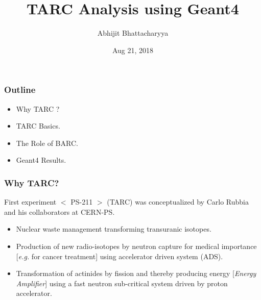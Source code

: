 \documentclass{beamer}
\title{TARC Analysis using Geant4}
\author{Abhijit Bhattacharyya}
\institute{Bhabha Atomic Research Center \\ Mumbai INDIA}
\date{Aug 21, 2018}
\begin{document}
    \begin{frame}
        \maketitle
    \end{frame}

    \begin{frame}
        \frametitle{Outline}
        \begin{itemize}
            \item Why TARC ?
            \item TARC Basics.
            \item The Role of BARC. 
            \item Geant4 Results.
        \end{itemize}        
    \end{frame}

    \begin{frame}
    \frametitle{Why TARC?}
    First experiment $<$ PS-211 $>$ (TARC) was conceptualized by Carlo Rubbia and his collaborators at CERN-PS.
    \pause
        \begin{itemize}
            \item<1-> Nuclear waste management transforming transuranic isotopes.
            \pause
            \item<2-> Production of new radio-isotopes by neutron capture for medical importance [\textit{e.g.} for cancer treatment] using accelerator driven system (ADS).
            \pause
            \item<3-> Transformation of actinides by fission and thereby producing energy [\textsl{Energy Amplifier}] using a fast neutron sub-critical system driven by proton accelerator.
        \end{itemize}
    \end{frame}
\end{document}
